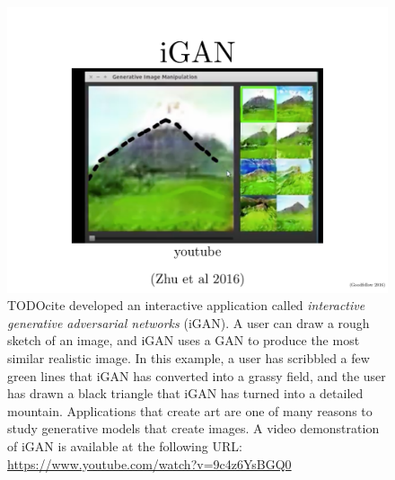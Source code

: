 \begin{figure}
  \centering
  \includegraphics[width=\textwidth]{igan}
  \caption{
TODOcite developed an interactive application called {\em interactive generative adversarial networks}
(iGAN). 
A user can draw a rough sketch of an image, and iGAN uses a GAN to produce the most similar
realistic image.
In this example, a user has scribbled a few green lines that iGAN has converted into a grassy
field, and the user has drawn a black triangle that iGAN has turned into a detailed mountain.
Applications that create art are one of many reasons to study generative models that create
images.
A video demonstration of iGAN is available at the following URL:
\url{https://www.youtube.com/watch?v=9c4z6YsBGQ0}
}
  \label{fig:igan}
\end{figure}


